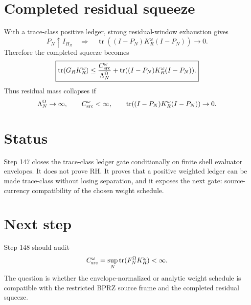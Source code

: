 \documentclass[11pt]{article}
\begin{document}
\section{Completed residual squeeze}
With a trace-class positive ledger, strong residual-window exhaustion gives
\[
  P_N\uparrow I_{H_R}
  \quad\Longrightarrow\quad
  \operatorname{tr}((I-P_N)K_R^\omega(I-P_N))\to0.
\]
Therefore the completed squeeze becomes
\[
  \boxed{
  \operatorname{tr}(G_RK_R^\omega)
  \le
  \frac{C_{\rm src}^\omega}{\Lambda_N^\Omega}
  +
  \operatorname{tr}((I-P_N)K_R^\omega(I-P_N)).
  }
\]
Thus residual mass collapses if
\[
  \Lambda_N^\Omega\to\infty,
  \qquad
  C_{\rm src}^\omega<\infty,
  \qquad
  \operatorname{tr}((I-P_N)K_R^\omega(I-P_N))\to0.
\]

\section{Status}
Step 147 closes the trace-class ledger gate conditionally on finite shell evaluator envelopes. It does not prove RH. It proves that a positive weighted ledger can be made trace-class without losing separation, and it exposes the next gate: source-currency compatibility of the chosen weight schedule.

\section{Next step}
Step 148 should audit
\[
  C_{\rm src}^\omega=\sup_N\operatorname{tr}(F_N^\Omega K_R^\omega)<\infty.
\]
The question is whether the envelope-normalized or analytic weight schedule is compatible with the restricted BPRZ source frame and the completed residual squeeze.
\end{document}
